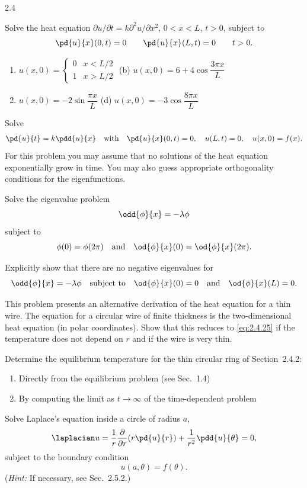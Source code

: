 \begin{exercises}{2.4}

\item\starred{} Solve the heat equation $\partial u/\partial t = k\partial^2 u/\partial x^2$, $0 < x < L$, $t > 0$, subject to
\[
\pd{u}{x}(0,t) = 0 \qquad \pd{u}{x}(L,t) = 0 \qquad t > 0.
\]
\begin{enumerate}
\item[(a)] $u(x,0) = \begin{cases} 0 & x < L/2 \\ 1 & x > L/2 \end{cases}$
\qquad
(b) $u(x,0) = 6 + 4\cos\dfrac{3\pi x}{L}$
\item[(c)] $u(x,0) = -2\sin\dfrac{\pi x}{L}$
\qquad
(d) $u(x,0) = -3\cos\dfrac{8\pi x}{L}$
\end{enumerate}

\item\starred{} Solve
\[
\pd{u}{t} = k\pdd{u}{x} \quad\text{with}\quad \pd{u}{x}(0,t) = 0,\quad u(L,t) = 0,\quad u(x,0) = f(x).
\]
For this problem you may assume that no solutions of the heat equation exponentially grow in time. You may also guess appropriate orthogonality conditions for the eigenfunctions.

\item\starred{} Solve the eigenvalue problem
\[
\odd{\phi}{x} = -\lambda\phi
\]
subject to
\[
\phi(0) = \phi(2\pi) \quad\text{and}\quad \od{\phi}{x}(0) = \od{\phi}{x}(2\pi).
\]

\item Explicitly show that there are no negative eigenvalues for
\[
\odd{\phi}{x} = -\lambda\phi \quad\text{subject to}\quad \od{\phi}{x}(0) = 0 \quad\text{and}\quad \od{\phi}{x}(L) = 0.
\]

\item This problem presents an alternative derivation of the heat equation for a thin wire. The equation for a circular wire of finite thickness is the two-dimensional heat equation (in polar coordinates). Show that this reduces to \eqref{eq:2.4.25} if the temperature does not depend on $r$ and if the wire is very thin.

\item Determine the equilibrium temperature for the thin circular ring of Section~2.4.2:
\begin{enumerate}
\item[(a)] Directly from the equilibrium problem (see Sec.~1.4)
\item[(b)] By computing the limit as $t \to \infty$ of the time-dependent problem
\end{enumerate}

\item Solve Laplace's equation inside a circle of radius $a$,
\[
\laplacian u = \frac{1}{r}\frac{\partial}{\partial r}\!\left(r\pd{u}{r}\right) + \frac{1}{r^2}\pdd{u}{\theta} = 0,
\]
subject to the boundary condition
\[
u(a,\theta) = f(\theta).
\]
(\emph{Hint:} If necessary, see Sec.~2.5.2.)

\end{exercises}
